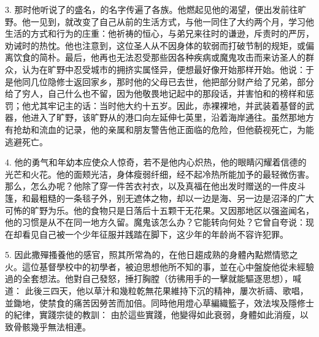 3. 那时他听说了的盛名，的名字传遍了各族。他燃起见他的渴望，便出发前往旷野。他一见到，就改变了自己从前的生活方式，与他一同住了大约两个月，学习他生活的方式和行为的庄重：他祈祷的恒心，与弟兄来往时的谦逊，斥责时的严厉，劝诫时的热忱。他也注意到，这位圣人从不因身体的软弱而打破节制的规矩，或偏离饮食的简朴。最后，他再也无法忍受那些因各种疾病或魔鬼攻击而来访圣人的群众，认为在旷野中忍受城市的拥挤实属怪异，便想最好像开始那样开始。他说：于是他同几位隐修士返回家乡，那时他的父母已去世，他把部分财产给了兄弟，部分给了穷人，自己什么也不留，因为他敬畏地记起中的那段话，并害怕和的榜样和惩罚；他尤其牢记主的话：当时他大约十五岁。因此，赤裸裸地，并武装着基督的武器，他进入了旷野，该旷野从的港口向左延伸七英里，沿着海岸通往。虽然那地方有抢劫和流血的记录，他的亲属和朋友警告他正面临的危险，但他藐视死亡，为能逃避死亡。\par

4. 他的勇气和年幼本应使众人惊奇，若不是他内心炽热，他的眼睛闪耀着信德的光芒和火花。他的面颊光洁，身体瘦弱纤细，经不起冷热所能加予的最轻微伤害。那么，怎么办呢？他除了穿一件苦衣衬衣，以及真福在他出发时赠送的一件皮斗篷，和最粗糙的一条毯子外，别无遮体之物，却以一边是海、另一边是沼泽的广大可怖的旷野为乐。他的食物只是日落后十五颗干无花果。又因那地区以强盗闻名，他的习惯是从不在同一地方久留。魔鬼该怎么办？它能转向何处？它曾自夸说：现在却看见自己被一个少年征服并践踏在脚下，这少年的年龄尚不容许犯罪。\par

5. 因此撒殫搔養他的感官，照其所常為的，在他日趨成熟的身體內點燃情慾之火。這位基督學校中的初學者，被迫思想他所不知的事，並在心中盤旋他從未經驗過的全套想法。他對自己發怒，捶打胸膛（彷彿用手的一擊就能驅逐思想），喊道：  此後三四天，他以草汁和幾粒乾無花果維持下沉的精神，屢次祈禱、歌唱，並鋤地，使禁食的痛苦因勞苦而加倍。同時他用燈心草編織籃子，效法埃及隱修士的紀律，實踐宗徒的教訓：  由於這些實踐，他變得如此衰弱，身體如此消瘦，以致骨骸幾乎無法相連。\par

